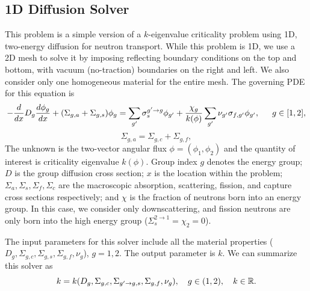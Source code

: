 \subsection{1D Diffusion Solver}
This problem is a simple version of a $k$-eigenvalue criticality problem using 1D, two-energy diffusion for neutron transport.  While this problem is 1D, we use a 2D mesh to solve it by imposing reflecting boundary conditions on the top and bottom, with vacuum (no-traction) boundaries on the right and left.  We also consider only one homogeneous material for the entire mesh.  The governing PDE for this equation is
\begin{equation}
-\frac{d }{d x}D_g\frac{d \phi_g}{d x}+(\Sigma_{g,a}+\Sigma_{g,s})\phi_g = \sum_{g'}\sigma_{s}^{g'\to g}\phi_{g'} + \frac{\chi_{g}}{k(\phi)}\sum_{g'}\nu_{g'}\sigma_{f,g'}\phi_{g'},\hspace{15pt} g\in[1,2],
\end{equation}
\begin{equation}
\Sigma_{g,a}=\Sigma_{g,c}+\Sigma_{g,f},
\end{equation}
The unknown is the two-vector angular flux $\phi=(\phi_1,\phi_2)$ and the quantity of interest is criticality eigenvalue $k(\phi)$.  Group index $g$ denotes the energy group; $D$ is the group diffusion cross section; $x$ is the location within the problem; $\Sigma_a,\Sigma_s,\Sigma_f,\Sigma_c$ are the macroscopic absorption, scattering, fission, and capture cross sections respectively; and $\chi$ is the fraction of neutrons born into an energy group.  In this case, we consider only downscattering, and fission neutrons are only born into the high energy group ($\Sigma_s^{2\to1}=\chi_2=0$).

The input parameters for this solver include all the material properties ($D_g,\Sigma_{g,c},\Sigma_{g,s},\Sigma_{g,f},\nu_g$), $g=1,2$.  The output parameter is $k$.  We can summarize this solver as 
\begin{equation}
k=k\qty(D_g,\Sigma_{g,c},\Sigma_{g'\to g,s},\Sigma_{g,f},\nu_g),\hspace{10pt}g\in(1,2),\hspace{10pt}k\in\mathbb{R}.
\end{equation}

